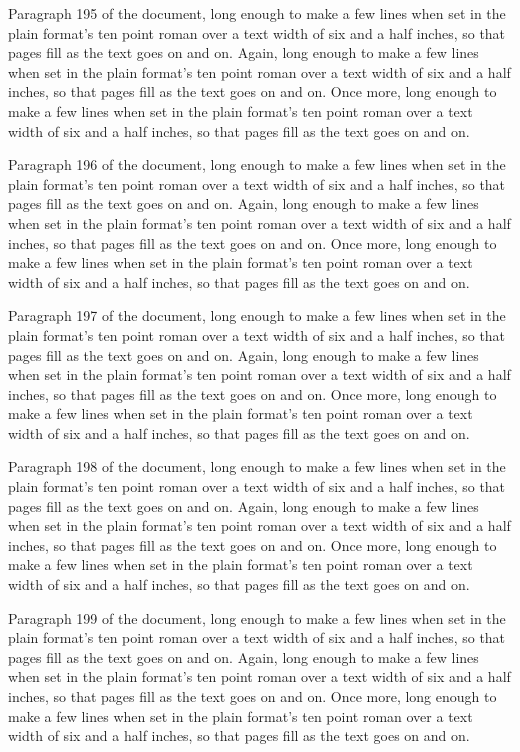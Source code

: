 Paragraph 195 of the document, long enough to make a few lines when set in the plain format's ten point roman over a text width of six and a half inches, so that pages fill as the text goes on and on. Again, long enough to make a few lines when set in the plain format's ten point roman over a text width of six and a half inches, so that pages fill as the text goes on and on. Once more, long enough to make a few lines when set in the plain format's ten point roman over a text width of six and a half inches, so that pages fill as the text goes on and on.

Paragraph 196 of the document, long enough to make a few lines when set in the plain format's ten point roman over a text width of six and a half inches, so that pages fill as the text goes on and on. Again, long enough to make a few lines when set in the plain format's ten point roman over a text width of six and a half inches, so that pages fill as the text goes on and on. Once more, long enough to make a few lines when set in the plain format's ten point roman over a text width of six and a half inches, so that pages fill as the text goes on and on.

Paragraph 197 of the document, long enough to make a few lines when set in the plain format's ten point roman over a text width of six and a half inches, so that pages fill as the text goes on and on. Again, long enough to make a few lines when set in the plain format's ten point roman over a text width of six and a half inches, so that pages fill as the text goes on and on. Once more, long enough to make a few lines when set in the plain format's ten point roman over a text width of six and a half inches, so that pages fill as the text goes on and on.

Paragraph 198 of the document, long enough to make a few lines when set in the plain format's ten point roman over a text width of six and a half inches, so that pages fill as the text goes on and on. Again, long enough to make a few lines when set in the plain format's ten point roman over a text width of six and a half inches, so that pages fill as the text goes on and on. Once more, long enough to make a few lines when set in the plain format's ten point roman over a text width of six and a half inches, so that pages fill as the text goes on and on.

Paragraph 199 of the document, long enough to make a few lines when set in the plain format's ten point roman over a text width of six and a half inches, so that pages fill as the text goes on and on. Again, long enough to make a few lines when set in the plain format's ten point roman over a text width of six and a half inches, so that pages fill as the text goes on and on. Once more, long enough to make a few lines when set in the plain format's ten point roman over a text width of six and a half inches, so that pages fill as the text goes on and on.

